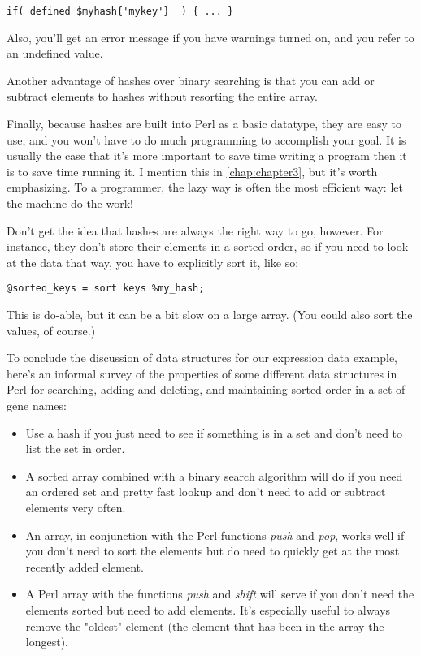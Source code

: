 \begin{lstlisting}
if( defined $myhash{'mykey'}  ) { ... }
\end{lstlisting}

Also, you'll get an error message if you have warnings turned on, and you refer to an undefined value.

Another advantage of hashes over binary searching is that you can add or subtract elements to hashes without resorting the entire array.

Finally, because hashes are built into Perl as a basic datatype, they are easy to use, and you won't have to do much programming to accomplish your goal. It is usually the case that it's more important to save time writing a program then it is to save time running it. I mention this in \autoref{chap:chapter3}, but it's worth emphasizing. To a programmer, the lazy way is often the most efficient way: let the machine do the work!

Don't get the idea that hashes are always the right way to go, however. For instance, they don't store their elements in a sorted order, so if you need to look at the data that way, you have to explicitly sort it, like so:

\begin{lstlisting}
@sorted_keys = sort keys %my_hash;
\end{lstlisting}

This is do-able, but it can be a bit slow on a large array. (You could also sort the values, of course.)

To conclude the discussion of data structures for our expression data example, here's an informal survey of the properties of some different data structures in Perl for searching, adding and deleting, and maintaining sorted order in a set of gene names: 

\begin{itemize}
  \item Use a hash if you just need to see if something is in a set and don't need to list the set in order.
  \item A sorted array combined with a binary search algorithm will do if you need an ordered set and pretty fast lookup and don't need to add or subtract elements very often.
  \item An array, in conjunction with the Perl functions \textit{push} and \textit{pop}, works well if you don't need to sort the elements but do need to quickly get at the most recently added element.
  \item A Perl array with the functions \textit{push} and \textit{shift} will serve if you don't need the elements sorted but need to add elements. It's especially useful to always remove the "oldest" element (the element that has been in the array the longest).
\end{itemize}

